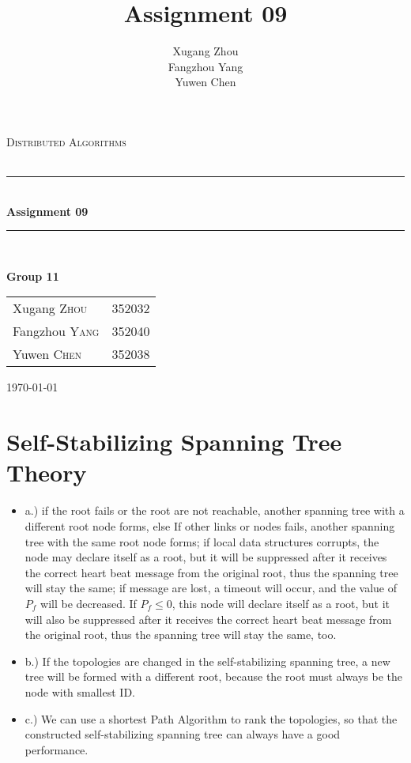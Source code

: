 \documentclass[a4paper, 14pt]{article}
\title{\bf Assignment 09}
\author{Xugang Zhou \\ Fangzhou Yang \\ Yuwen Chen}
\newcommand{\HRule}{\rule{\linewidth}{0.5mm}}
\begin{document}
\begin{titlepage}
\begin{center}
\vfill
\textsc{\LARGE Distributed Algorithms}\\[1.5cm]
\textsc{\Large }\\[0.5cm]

\HRule \\[0.4cm]
{\huge \bfseries Assignment 09}\\[0.4cm]
\HRule \\[1.5cm]
\begin{minipage}{0.4\textwidth}
\begin{flushleft} \large
\large{\textbf{Group 11}}
\end{flushleft}
\end{minipage}
\begin{minipage}{0.4\textwidth}
\begin{flushright} \large
\begin{tabular}{ll}
Xugang \textsc{Zhou} & 352032\\
Fangzhou \textsc{Yang} & 352040\\
Yuwen \textsc{Chen} & 352038
\end{tabular}
\end{flushright}
\end{minipage}
\vfill
{\large \today}\\
\end{center}
\end{titlepage}
\thispagestyle{fancy}

\section{Self-Stabilizing Spanning Tree Theory}
\begin{itemize}
\item a.) if the root fails or the root are not reachable, another spanning tree with a different root node forms, else If other links or nodes fails, another spanning tree with the same root node forms; if local data structures corrupts, the node may declare itself as a root, but it will be suppressed after it receives the correct heart beat message from the original root, thus the spanning tree will stay the same; if message are lost, a timeout will occur, and the value of $P_f$ will be decreased. If $P_f \le 0$, this node will declare itself as a root, but it will also be suppressed after it receives the correct heart beat message from the original root, thus the spanning tree will stay the same, too.

\item b.) If the topologies are changed in the self-stabilizing spanning tree, a new tree will be formed with a different root, because the root must always be the node with smallest ID.

\item c.) We can use a shortest Path Algorithm to rank the topologies, so that the constructed self-stabilizing spanning tree can always have a good performance.

\end{itemize}


%
\end{document}
